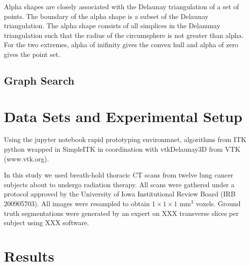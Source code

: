 \documentclass{llncs}
\begin{document}
Alpha shapes are closely associated with the Delaunay triangulation of a set of points. The boundary of the alpha shape is a subset of the Delaunay triangulation. The alpha shape consists of all simplices in the Delanunay triangulation such that the radius of the circumsphere is not greater than alpha. For the two extremes, alpha of inifinity gives the convex hull and alpha of zero gives the point set. 
%
\subsection{Graph Search}
%

%
\section{Data Sets and Experimental Setup}
%
Using the jupyter notebook \cite{PER-GRA:2007} rapid prototyping environmnet,  algorithms from ITK\cite{johnson2015itk} python wrapped in SimpleITK \cite{10.3389/fninf.2013.00045} in coordination with vtkDelaunay3D from VTK (www.vtk.org).

In this study we used breath-hold thoracic CT scans from twelve lung cancer subjects
about to undergo radiation therapy. All scans were gathered under a protocol approved by the University of Iowa Institutional Review Board (IRB 200905703). All images were resampled to obtain $1\times{}1\times{}1$ mm$^3$ voxels. Ground truth segmentations were generated by an expert on XXX transverse slices per subject using XXX software. 
%
\section{Results}
%


\newlength\intercol
\setlength\intercol{15pt}
\newlength\betweenwidth
\setlength\betweenwidth{10pt}
\newcommand\icspace{@{\hspace\intercol}}
\newcommand\inspace{@{\hspace\betweenwidth}}
\newcommand\MC[1]{\multicolumn{2}{c\icspace}{#1}}
\newcommand\MClast[1]{\multicolumn{2}{c}{#1}}
\end{document}
